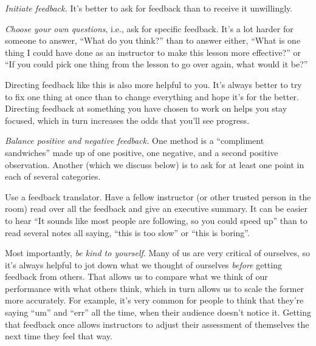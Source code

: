 \begin{genumerate}

\item
  \emph{Initiate feedback.} It's better to ask for feedback than to
  receive it unwillingly.

\item
  \emph{Choose your own questions}, i.e., ask for specific
  feedback. It's a lot harder for someone to answer, ``What do you
  think?'' than to answer either, ``What is one thing I could have
  done as an instructor to make this lesson more effective?''  or ``If
  you could pick one thing from the lesson to go over again, what
  would it be?''

  Directing feedback like this is also more helpful to you.  It's
  always better to try to fix one thing at once than to change
  everything and hope it's for the better.  Directing feedback at
  something you have chosen to work on helps you stay focused, which
  in turn increases the odds that you'll see progress.

\item
  \emph{Balance positive and negative feedback.}  One method is a
  ``compliment sandwiches'' made up of one positive, one negative, and
  a second positive observation.  Another (which we discuss below) is
  to ask for at least one point in each of several categories.

\item
  Use a feedback translator. Have a fellow instructor (or other
  trusted person in the room) read over all the feedback and give an
  executive summary. It can be easier to hear ``It sounds like most
  people are following, so you could speed up'' than to read several
  notes all saying, ``this is too slow'' or ``this is boring''.

\item
  Most importantly, \emph{be kind to yourself}.  Many of us are very
  critical of ourselves, so it's always helpful to jot down what we
  thought of ourselves \emph{before} getting feedback from others.
  That allows us to compare what we think of our performance with what
  others think, which in turn allows us to scale the former more
  accurately.  For example, it's very common for people to think that
  they're saying ``um'' and ``err'' all the time, when their audience
  doesn't notice it.  Getting that feedback once allows instructors to
  adjust their assessment of themselves the next time they feel that
  way.

\end{genumerate}

